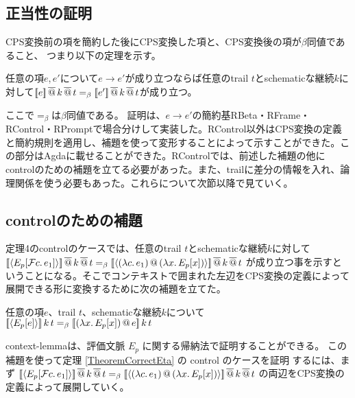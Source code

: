 \subsection{正当性の証明}
CPS変換前の項を簡約した後にCPS変換した項と、CPS変換後の項が$\beta$同値であること、
つまり以下の定理を示す。
\begin{theorem}[正当性の証明]\upshape
  任意の項$e$,$\, e'$について$e \to e'$が成り立つならば任意のtrail $t$とschematicな継続$k$に対して$[\![{e}]\!]\,\overline{@}\, k \,\overline{@}\, t =_{\beta} [\![{e'}]\!] \,\overline{@}\, k \,\overline{@}\, t$が成り立つ。
\label{TheoremCorrectEta}
\end{theorem}

ここで$=_{\beta}$は$\beta$同値である。
証明は、$e \to e'$の簡約基\textsf{RBeta}・\textsf{RFrame}・\textsf{RControl}・\textsf{RPrompt}で場合分けして実装した。\textsf{RControl}以外はCPS変換の定義と簡約規則を適用し、補題を使って変形することによって示すことができた。この部分はAgdaに載せることができた。\textsf{RControl}では、前述した補題の他にcontrolのための補題を立てる必要があった。また、trailに差分の情報を入れ、論理関係を使う必要もあった。これらについて次節以降で見ていく。


\subsection{controlのための補題}
定理4のcontrolのケースでは、任意のtrail $t$とschematicな継続$k$に対して\\
$[\![{\langle{E_p[{\cal F}{c}.\,{e_1}]}\rangle}]\!]\,\overline{@}\, k \,\overline{@}\, t =_{\beta} [\![{\langle{{(\lambda{c}.\,{e_1})}\,@\,{(\lambda{x}.\,{E_p[x]})}}\rangle}]\!] \,\overline{@}\, k \,\overline{@}\, t$ が成り立つ事を示すということになる。そこでコンテキストで囲まれた左辺をCPS変換の定義によって展開できる形に変換するために次の補題を立てた。

\begin{lemma}\upshape
  任意の項$e$、trail $t$、schematicな継続$k$について\\
  $[\![{\langle{E_p[e]}\rangle}]\!]\,k\,t =_{\beta} [\![{{(\lambda{x}.\,{E_p[x]})}\,@\,{e}}]\!]\,k\,t$
\end{lemma}
context-lemmaは、評価文脈 $E_p$ に関する帰納法で証明することができる。
この補題を使って定理 \ref{TheoremCorrectEta} の control のケースを証明
するには、まず
$[\![{\langle{E_p[{\cal F}{c}.\,{e_1}]}\rangle}]\!]\,\overline{@}\, k \,\overline{@}\, t =_{\beta} [\![{\langle{{(\lambda{c}.\,{e_1})}\,@\,{(\lambda{x}.\,{E_p[x]})}}\rangle}]\!] \,\overline{@}\, k \,\overline{@}\, t$
の両辺をCPS変換の定義によって展開していく。


